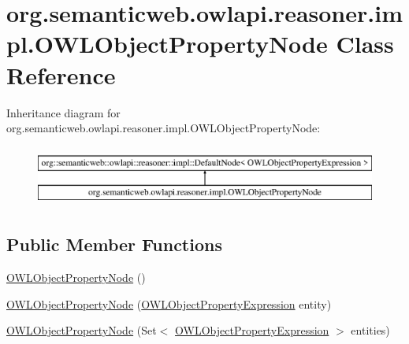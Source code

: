 \hypertarget{classorg_1_1semanticweb_1_1owlapi_1_1reasoner_1_1impl_1_1_o_w_l_object_property_node}{\section{org.\-semanticweb.\-owlapi.\-reasoner.\-impl.\-O\-W\-L\-Object\-Property\-Node Class Reference}
\label{classorg_1_1semanticweb_1_1owlapi_1_1reasoner_1_1impl_1_1_o_w_l_object_property_node}
}
Inheritance diagram for org.\-semanticweb.\-owlapi.\-reasoner.\-impl.\-O\-W\-L\-Object\-Property\-Node\-:\begin{figure}[H]
\begin{center}
\leavevmode
\includegraphics[height=2.000000cm]{classorg_1_1semanticweb_1_1owlapi_1_1reasoner_1_1impl_1_1_o_w_l_object_property_node}
\end{center}
\end{figure}
\subsection*{Public Member Functions}
\begin{DoxyCompactItemize}
\item 
\hyperlink{classorg_1_1semanticweb_1_1owlapi_1_1reasoner_1_1impl_1_1_o_w_l_object_property_node_aec2c9d1d87b91a0b21a9d14acb13eca9}{O\-W\-L\-Object\-Property\-Node} ()
\item 
\hyperlink{classorg_1_1semanticweb_1_1owlapi_1_1reasoner_1_1impl_1_1_o_w_l_object_property_node_a970eee31562608491dd820566e575d30}{O\-W\-L\-Object\-Property\-Node} (\hyperlink{interfaceorg_1_1semanticweb_1_1owlapi_1_1model_1_1_o_w_l_object_property_expression}{O\-W\-L\-Object\-Property\-Expression} entity)
\item 
\hyperlink{classorg_1_1semanticweb_1_1owlapi_1_1reasoner_1_1impl_1_1_o_w_l_object_property_node_a7169d07b326e59e57df8c5089b990209}{O\-W\-L\-Object\-Property\-Node} (Set$<$ \hyperlink{interfaceorg_1_1semanticweb_1_1owlapi_1_1model_1_1_o_w_l_object_property_expression}{O\-W\-L\-Object\-Property\-Expression} $>$ entities)
\end{DoxyCompactItemize}
